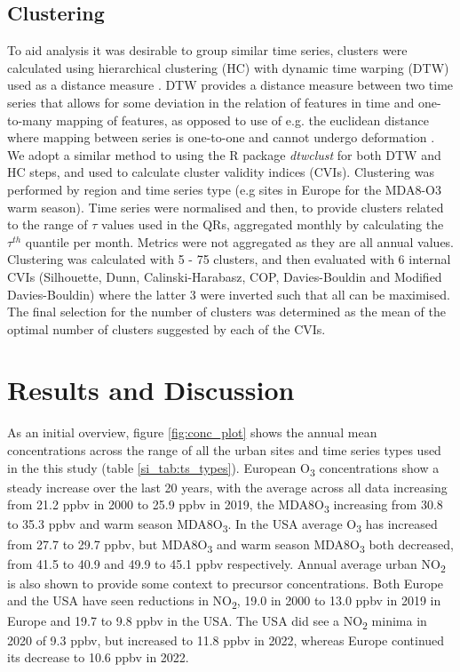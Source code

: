 \documentclass[journal abbreviation, manuscript]{copernicus}
\begin{document}
\subsection{Clustering} \label{sect:method_clustering}
To aid analysis it was desirable to group similar time series, clusters were calculated using hierarchical clustering (HC) with dynamic time warping (DTW) used as a distance measure \citep{AGHABOZORGI201516}. DTW provides a distance measure between two time series that allows for some deviation in the relation of features in time and one-to-many mapping of features, as opposed to use of e.g. the euclidean distance where mapping between series is one-to-one and cannot undergo deformation \citep{Berndt_dtw, Abdullah_Keogh_dtw}. We adopt a similar method to \cite{REED2025110686} using the R package \emph{dtwclust} \citep{dtwclust} for both DTW and HC steps, and used to calculate cluster validity indices (CVIs). Clustering was performed by region and time series type (e.g sites in Europe for the MDA8-O3 warm season). Time series were normalised and then, to provide clusters related to the range of $\tau$ values used in the QRs, aggregated monthly by calculating the $\tau^{th}$ quantile per month. Metrics were not aggregated as they are all annual values. Clustering was calculated with 5 - 75 clusters, and then evaluated with 6 internal CVIs (Silhouette, Dunn, Calinski-Harabasz, COP, Davies-Bouldin and Modified Davies-Bouldin) where the latter 3 were inverted such that all can be maximised. The final selection for the number of clusters was determined as the mean of the optimal number of clusters suggested by each of the CVIs. 

\clearpage
\section{Results and Discussion}

As an initial overview, figure \ref{fig:conc_plot} shows the annual mean concentrations across the range of all the urban sites and time series types used in the this study (table \ref{si_tab:ts_types}). European O\textsubscript{3} concentrations show a steady increase over the last 20 years, with the average across all data increasing from 21.2 ppbv in 2000 to 25.9 ppbv in 2019, the MDA8O\textsubscript{3} increasing from 30.8 to 35.3 ppbv and warm season MDA8O\textsubscript{3}. In the USA average O\textsubscript{3} has increased from 27.7 to 29.7 ppbv, but MDA8O\textsubscript{3} and warm season MDA8O\textsubscript{3} both decreased, from 41.5 to 40.9 and 49.9 to 45.1 ppbv respectively. Annual average urban NO\textsubscript{2} is also shown to provide some context to precursor concentrations. Both Europe and the USA have seen reductions in NO\textsubscript{2}, 19.0 in 2000 to 13.0 ppbv in 2019 in Europe and 19.7 to 9.8 ppbv in the USA. The USA did see a NO\textsubscript{2} minima in 2020 of 9.3 ppbv, but increased to 11.8 ppbv in 2022, whereas Europe continued its decrease to 10.6 ppbv in 2022. 
\end{document}
